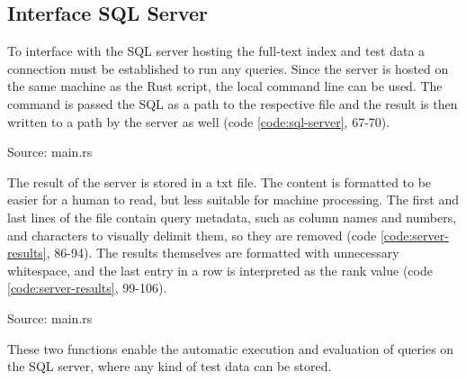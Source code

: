 \subsection{Interface SQL Server}
To interface with the \ac{SQL} server hosting the full-text index and test data a connection must be established to run any queries. Since the server is hosted on the same machine as the Rust script, the local command line can be used. The command is passed the \ac{SQL} as a path to the respective file and the result is then written to a path by the server as well (code \ref{code:sql-server}, 67-70).
\begin{codeenv}
    \label{code:sql-server}
    
    \centerline{Source: main.rs}
\end{codeenv}
The result of the server is stored in a txt file. The content is formatted to be easier for a human to read, but less suitable for machine processing. The first and last lines of the file contain query metadata, such as column names and numbers, and characters to visually delimit them, so they are removed (code \ref{code:server-results}, 86-94). The results themselves are formatted with unnecessary whitespace, and the last entry in a row is interpreted as the rank value (code \ref{code:server-results}, 99-106).
\begin{codeenv}
    \label{code:server-results}
    
    \centerline{Source: main.rs}
\end{codeenv}
These two functions enable the automatic execution and evaluation of queries on the \ac{SQL} server, where any kind of test data can be stored.